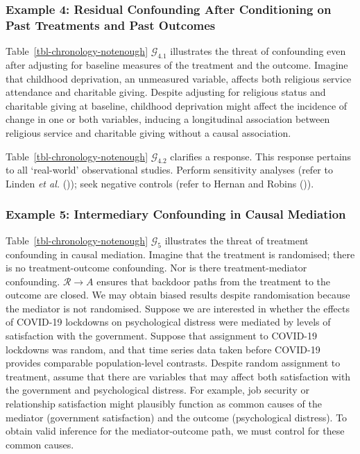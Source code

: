 \documentclass[
  single column]{article}
\begin{document}
\subsubsection{Example 4: Residual Confounding After Conditioning on
Past Treatments and Past
Outcomes}\label{example-4-residual-confounding-after-conditioning-on-past-treatments-and-past-outcomes}

Table~\ref{tbl-chronology-notenough} \(\mathcal{G}_{4.1}\) illustrates
the threat of confounding even after adjusting for baseline measures of
the treatment and the outcome. Imagine that childhood deprivation, an
unmeasured variable, affects both religious service attendance and
charitable giving. Despite adjusting for religious status and charitable
giving at baseline, childhood deprivation might affect the incidence of
change in one or both variables, inducing a longitudinal association
between religious service and charitable giving without a causal
association.

Table~\ref{tbl-chronology-notenough} \(\mathcal{G}_{4.2}\) clarifies a
response. This response pertains to all `real-world' observational
studies. Perform sensitivity analyses (refer to Linden \emph{et al.}
()); seek negative controls (refer
to Hernan and Robins ()).

\subsubsection{Example 5: Intermediary Confounding in Causal
Mediation}\label{example-5-intermediary-confounding-in-causal-mediation}

Table~\ref{tbl-chronology-notenough} \(\mathcal{G}_5\) illustrates the
threat of treatment confounding in causal mediation. Imagine that the
treatment is randomised; there is no treatment-outcome confounding. Nor
is there treatment-mediator confounding. \(\mathcal{R} \to A\) ensures
that backdoor paths from the treatment to the outcome are closed. We may
obtain biased results despite randomisation because the mediator is not
randomised. Suppose we are interested in whether the effects of COVID-19
lockdowns on psychological distress were mediated by levels of
satisfaction with the government. Suppose that assignment to COVID-19
lockdowns was random, and that time series data taken before COVID-19
provides comparable population-level contrasts. Despite random
assignment to treatment, assume that there are variables that may affect
both satisfaction with the government and psychological distress. For
example, job security or relationship satisfaction might plausibly
function as common causes of the mediator (government satisfaction) and
the outcome (psychological distress). To obtain valid inference for the
mediator-outcome path, we must control for these common causes.
\end{document}
